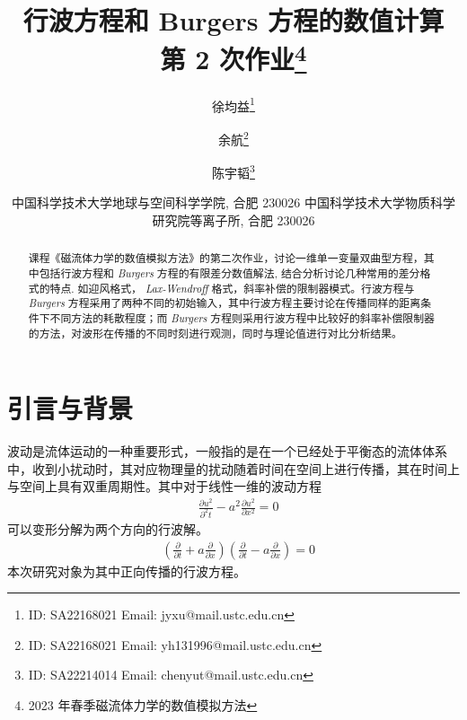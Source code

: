 \documentclass[10.5pt
]{article}
\def\Term{2023 年春季}
\def\Course{磁流体力学的数值模拟方法}
\begin{document}
\title{行波方程和 Burgers 方程的数值计算 \\
  第 2 次作业\footnote{\Term\Course}}

\author{徐均益\footnote{ID: SA22168021 Email: jyxu@mail.ustc.edu.cn}
  \and
  余航\footnote{ID: SA22168021 Email: yh131996@mail.ustc.edu.cn}
  \and
  陈宇韬\footnote{ID: SA22214014 Email: chenyut@mail.ustc.edu.cn}
}

\date{%
\scriptsize%
中国科学技术大学地球与空间科学学院, 合肥 230026
中国科学技术大学物质科学研究院等离子所, 合肥 230026
%
}


\maketitle

\begin{abstract}
课程《磁流体力学的数值模拟方法》的第二次作业，讨论一维单一变量双曲型方程，其中包括行波方程和 \textit{Burgers} 方程的有限差分数值解法,
结合分析讨论几种常用的差分格式的特点. 如迎风格式， \textit{Lax-Wendroff} 格式，斜率补偿的限制器模式。行波方程与 \textit{Burgers} 方程采用了两种不同的初始输入，其中行波方程主要讨论在传播同样的距离条件下不同方法的耗散程度；而 \textit{Burgers} 方程则采用行波方程中比较好的斜率补偿限制器的方法，对波形在传播的不同时刻进行观测，同时与理论值进行对比分析结果。
\end{abstract}

\section{引言与背景}
波动是流体运动的一种重要形式，一般指的是在一个已经处于平衡态的流体体系中，收到小扰动时，其对应物理量的扰动随着时间在空间上进行传播，其在时间上与空间上具有双重周期性。其中对于线性一维的波动方程
\begin{align}
& \frac{\partial u^2}{\partial^2 t} - a^2 \frac{\partial u^2}{\partial x^2} = 0
\label{EqnCon}
\end{align}
可以变形分解为两个方向的行波解。
\begin{align}
    & \left( \frac{\partial }{\partial t} + a \frac{\partial }{\partial x} \right) \left( \frac{\partial }{\partial t} - a \frac{\partial }{\partial x} \right)= 0
\label{EqnCon}
\end{align}
本次研究对象为其中正向传播的行波方程。
\end{document}
